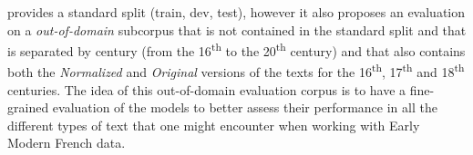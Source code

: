 \freemlpm provides a standard split (train, dev, test), however it also proposes an evaluation on a \emph{out-of-domain} subcorpus that is not contained in the standard split and that is separated by century (from the 16\textsuperscript{th} to the 20\textsuperscript{th} century) and that also contains both the \emph{Normalized} and \emph{Original} versions of the texts for the 16\textsuperscript{th}, 17\textsuperscript{th} and 18\textsuperscript{th} centuries. The idea of this out-of-domain evaluation corpus is to have a fine-grained evaluation of the models to better assess their performance in all the different types of text that one might encounter when working with Early Modern French data.

\begin{table}[ht]
    \centering\small
\end{table}
